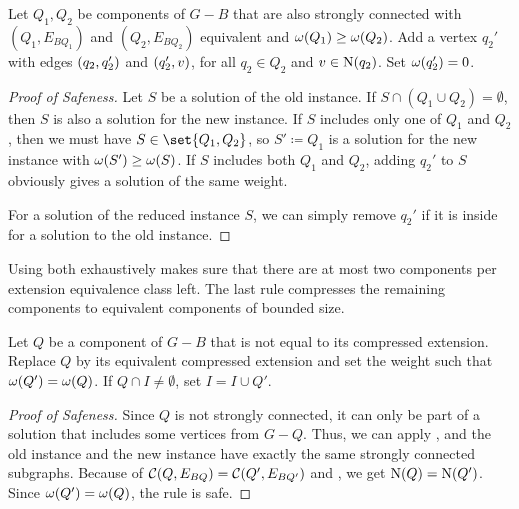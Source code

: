 \begin{theorem}
\begin{lemma}
\begin{theorem}
\begin{lemma}
\begin{reduction*}
\begin{reduction*}
\begin{reduction*}

\iflong
\begin{reduction*}
\else
\begin{reduction*}[$\star$]
\fi
\label{red:scc_twins_single}
  Let $Q_1, Q_2$ be components of $G - B$ that are also strongly connected with $(Q_1, E_{BQ_1})$ and $(Q_2, E_{BQ_2})$ equivalent and $\operatorname{\omega}({Q_1}) \ge \operatorname{\omega}({Q_2})$.
  Add a vertex $q_2'$ with edges $({q_2}, {q_2'})$ and $({q_2'}, {v})$, for all $q_2 \in Q_2$ and $v \in \operatorname{N}({q_2})$. Set $\operatorname{\omega}({q_2'}) = 0$.
\end{reduction*}
\iflong
\begin{proof}[Proof of Safeness]
  Let $S$ be a solution of the old instance.
  If $S \cap (Q_1 \cup Q_2) = \emptyset$, then $S$ is also a solution for the new instance.
  If $S$ includes only one of $Q_1$ and $Q_2$, then we must have $S \in \set{Q_1, Q_2}$, so $S' \coloneqq Q_1$ is a solution for the new instance with $\operatorname{\omega}({S'}) \ge \operatorname{\omega}({S})$.
  If $S$ includes both $Q_1$ and $Q_2$, adding $q_2'$ to $S$ obviously gives a solution of the same weight.

  For a solution of the reduced instance $S$, we can simply remove $q_2'$ if it is inside for a solution to the old instance.
\end{proof}
\fi

Using both  exhaustively makes sure that there are at most two components per extension equivalence class left.
The last rule compresses the remaining components to equivalent components of bounded size.

\begin{reduction*}
\label{red:scc_comp}
  Let $Q$ be a component of $G - B$ that is not equal to its compressed extension. Replace $Q$ by its equivalent compressed extension and set the weight such that $\operatorname{\omega}({Q'}) = \operatorname{\omega}({Q})$. If $Q \cap I \ne \emptyset$, set $I = I \cup Q'$.
\end{reduction*} 
\begin{proof}[Proof of Safeness]
  Since $Q$ is not strongly connected, it can only be part of a solution that includes some vertices from $G-Q$. Thus, we can apply , and the old instance and the new instance have exactly the same strongly connected subgraphs. Because of $\operatorname{\mathcal{C}}({Q, E_{BQ}}) = \operatorname{\mathcal{C}}({Q', E_{BQ'}})$ and , we get $\operatorname{N}({Q}) = \operatorname{N}({Q'})$. Since $\operatorname{\omega}({Q'}) = \operatorname{\omega}({Q})$, the rule is safe.
\end{proof}


\end{reduction*}
\end{reduction*}
\end{reduction*}
\end{reduction*}
\end{lemma}
\end{theorem}
\end{lemma}
\end{theorem}
